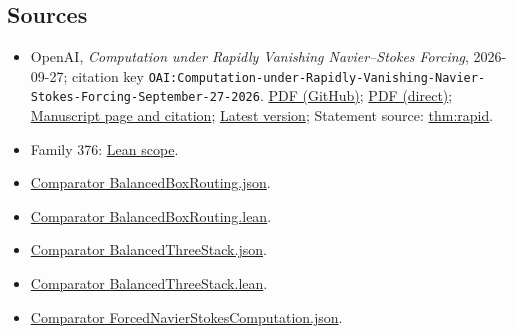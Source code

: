 \documentclass[11pt]{article}
\begin{document}
\subsection{Sources}
\begin{itemize}
\item OpenAI, \emph{Computation under Rapidly Vanishing Navier–Stokes Forcing}, 2026-09-27; citation key \texttt{OAI:Computation-under-Rapidly-Vanishing-Navier-Stokes-Forcing-September-27-2026}. \href{https://github.com/openai/math/blob/adc7f1241b42e322a6451854ab7e4b4c146bf78a/preprints/Computation-under-Rapidly-Vanishing-Navier-Stokes-Forcing-September-27-2026/manuscript.pdf}{PDF (GitHub)}; \href{https://github.com/openai/math/raw/adc7f1241b42e322a6451854ab7e4b4c146bf78a/preprints/Computation-under-Rapidly-Vanishing-Navier-Stokes-Forcing-September-27-2026/manuscript.pdf}{PDF (direct)}; \href{https://github.com/openai/math/blob/adc7f1241b42e322a6451854ab7e4b4c146bf78a/preprints/Computation-under-Rapidly-Vanishing-Navier-Stokes-Forcing-September-27-2026/README.md}{Manuscript page and citation}; \href{https://github.com/openai/math/blob/main/preprints/Computation-under-Rapidly-Vanishing-Navier-Stokes-Forcing-September-27-2026/manuscript.pdf}{Latest version}; Statement source: \href{https://github.com/openai/math/blob/adc7f1241b42e322a6451854ab7e4b4c146bf78a/preprints/Computation-under-Rapidly-Vanishing-Navier-Stokes-Forcing-September-27-2026/build/addressed.tex\#L11}{thm:rapid}.
\item Family 376: \href{https://github.com/openai/math/blob/adc7f1241b42e322a6451854ab7e4b4c146bf78a/lean/docs/376.md}{Lean scope}.
\item \href{https://github.com/openai/math/blob/adc7f1241b42e322a6451854ab7e4b4c146bf78a/lean/ComparatorChallenges/BalancedBoxRouting.json}{Comparator BalancedBoxRouting.json}.
\item \href{https://github.com/openai/math/blob/adc7f1241b42e322a6451854ab7e4b4c146bf78a/lean/ComparatorChallenges/BalancedBoxRouting.lean}{Comparator BalancedBoxRouting.lean}.
\item \href{https://github.com/openai/math/blob/adc7f1241b42e322a6451854ab7e4b4c146bf78a/lean/ComparatorChallenges/BalancedThreeStack.json}{Comparator BalancedThreeStack.json}.
\item \href{https://github.com/openai/math/blob/adc7f1241b42e322a6451854ab7e4b4c146bf78a/lean/ComparatorChallenges/BalancedThreeStack.lean}{Comparator BalancedThreeStack.lean}.
\item \href{https://github.com/openai/math/blob/adc7f1241b42e322a6451854ab7e4b4c146bf78a/lean/ComparatorChallenges/ForcedNavierStokesComputation.json}{Comparator ForcedNavierStokesComputation.json}.

\end{itemize}
\end{document}
